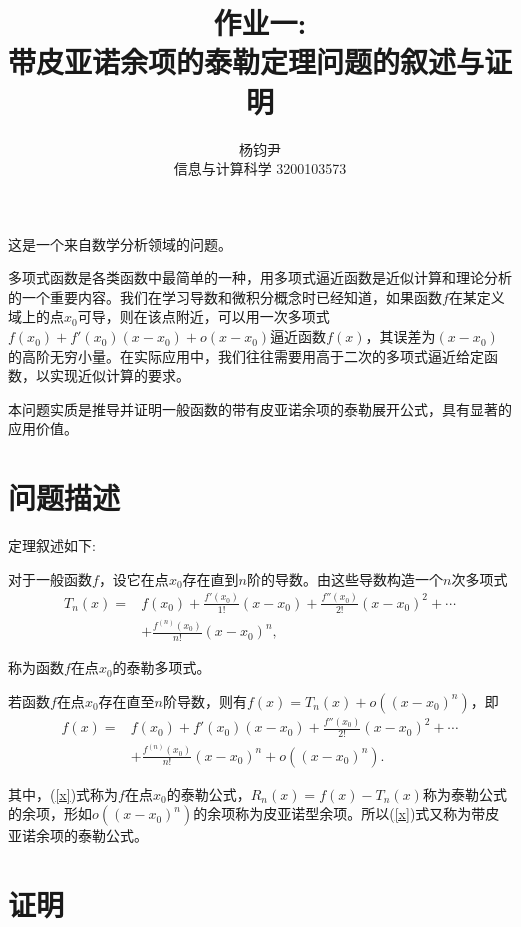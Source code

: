\documentclass{ctexart}
\title{作业一: \\带皮亚诺余项的泰勒定理问题的叙述与证明}
\author{杨钧尹 \\ 信息与计算科学 3200103573}
\begin{document}
\maketitle

这是一个来自数学分析领域的问题。

多项式函数是各类函数中最简单的一种，用多项式逼近函数是近似计算和理论分析的一个重要内容。我们在学习导数和微积分概念时已经知道，如果函数$f$在某定义域上的点$x_0$可导，则在该点附近，可以用一次多项式$f(x_0)+f'(x_0)(x-x_0)+o(x-x_0)$逼近函数$f(x)$，其误差为$(x-x_0)$的高阶无穷小量。在实际应用中，我们往往需要用高于二次的多项式逼近给定函数，以实现近似计算的要求。

本问题实质是推导并证明一般函数的带有皮亚诺余项的泰勒展开公式，具有显著的应用价值。

\section{问题描述}

定理叙述如下: 

对于一般函数$f$，设它在点$x_0$存在直到$n$阶的导数。由这些导数构造一个$n$次多项式
\begin{equation}\label{eq1}
	\begin{aligned}
		T_n(x)=&f(x_0)+\displaystyle\frac{f'(x_0)}{1!}(x-x_0)+\displaystyle\frac{f''(x_0)}{2!}(x-x_0)^2+\cdots \\
		& +\displaystyle\frac{f^{(n)}(x_0)}{n!}(x-x_0)^n,
	\end{aligned}
\end{equation}

称为函数$f$在点$x_0$的泰勒多项式。

若函数$f$在点$x_0$存在直至$n$阶导数，则有$f(x)=T_n(x)+o((x-x_0)^n)$，即
\begin{equation}\label{x}
	\begin{aligned}
		f(x)=&f(x_0)+f'(x_0)(x-x_0)+\displaystyle\frac{f''(x_0)}{2!}(x-x_0)^2+\cdots \\
		& +\displaystyle\frac{f^{(n)}(x_0)}{n!}(x-x_0)^n+o((x-x_0)^n).
	\end{aligned}
\end{equation}

其中，(\ref{x})式称为$f$在点$x_0$的泰勒公式，$R_n(x)=f(x)-T_n(x)$称为泰勒公式的余项，形如$o((x-x_0)^n)$的余项称为皮亚诺型余项。所以(\ref{x})式又称为带皮亚诺余项的泰勒公式。

\section{证明}
\end{document}
